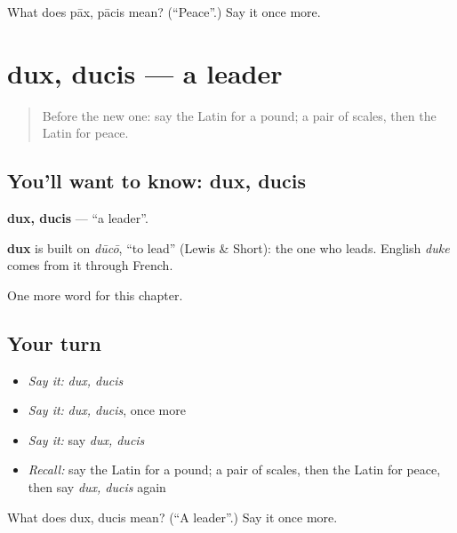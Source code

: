 \begin{tcolorbox}[breakable,colback=teal!4,colframe=teal!35!black,title={Before you move on}]
What does pāx, pācis mean? (\textquotedblleft{}Peace\textquotedblright{}.) Say it once more.
\end{tcolorbox}
\section[dux, ducis]{dux, ducis — a leader}

\label{lesson:LA-C187-dux}



\begin{quote}
Before the new one: say the Latin for a pound; a pair of scales, then the Latin for peace.
\end{quote}

\subsection*{You'll want to know: dux, ducis}
\textbf{dux, ducis} — \textquotedblleft{}a leader\textquotedblright{}.

\begin{cousinweb}
\textbf{dux} is built on \emph{dūcō}, \textquotedblleft{}to lead\textquotedblright{} (Lewis \& Short): the one who leads. English \emph{duke} comes from it through French.
\end{cousinweb}

\begin{grammarlens}[title={What you've built}]
One more word for this chapter.
\end{grammarlens}

\subsection*{Your turn}
\begin{itemize}
\raggedright
  \item \emph{Say it:} \emph{dux, ducis}
  \item \emph{Say it:} \emph{dux, ducis}, once more
  \item \emph{Say it:} say \emph{dux, ducis}
  \item \emph{Recall:} say the Latin for a pound; a pair of scales, then the Latin for peace, then say \emph{dux, ducis} again
\end{itemize}

\begin{tcolorbox}[breakable,colback=teal!4,colframe=teal!35!black,title={Before you move on}]
What does dux, ducis mean? (\textquotedblleft{}A leader\textquotedblright{}.) Say it once more.
\end{tcolorbox}
